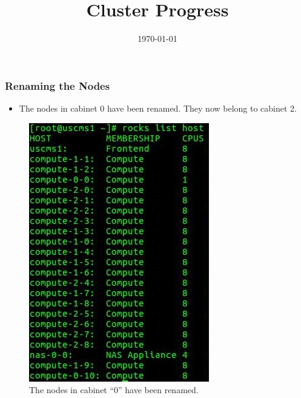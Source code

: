 \documentclass{beamer}
\title{Cluster Progress}
\date{\today}
\begin{document}

\begin{frame}
  \maketitle
\end{frame}



\begin{frame}

  \frametitle{Renaming the Nodes}
  
  \begin{multicols}{2}

    \begin{itemize}
    \item The nodes in cabinet 0 have been renamed. They now belong to cabinet 2. 
    \end{itemize}
    
    \columnbreak
    
    \begin{figure}[H]
      \begin{center}
        \includegraphics[scale=0.35]{renamed_nodes.png}
      \end{center}
      \caption{The nodes in cabinet ``0'' have been renamed.}
    \end{figure}
  
  \end{multicols}
  
\end{frame}


\end{document}
